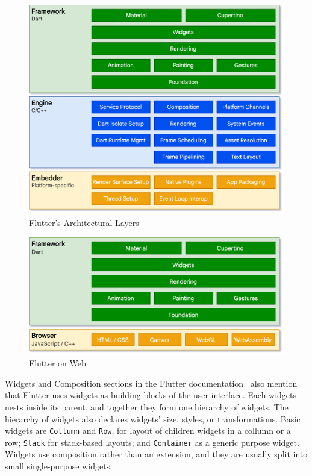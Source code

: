 \begin{figure}
    \centering
    \includegraphics[width=1\linewidth]{assets/design/flutterlayers.png}
    \caption{Flutter's Architectural Layers~\cite{a2022_flutter_architecture}}
    \label{fig:design:flutterlayers}
\end{figure}

\begin{figure}
    \centering
    \includegraphics[width=1\linewidth]{assets/design/flutterweb.png}
    \caption{Flutter on Web~\cite{a2022_flutter_architecture}}
    \label{fig:design:flutterweb}
\end{figure}

Widgets and Composition sections in the Flutter documentation~\cite{a2022_flutter_architecture} also mention that Flutter uses widgets as building blocks of the user interface.
Each widgets nests inside its parent, and together they form one hierarchy of widgets.
The hierarchy of widgets also declares widgets' size, styles, or transformations.
Basic widgets are \texttt{Collumn} and \texttt{Row}, for layout of children widgets in a collumn or a row; \texttt{Stack} for stack-based layouts; and \texttt{Container} as a generic purpose widget.
Widgets use composition rather than an extension, and they are usually split into small single-purpose widgets.

